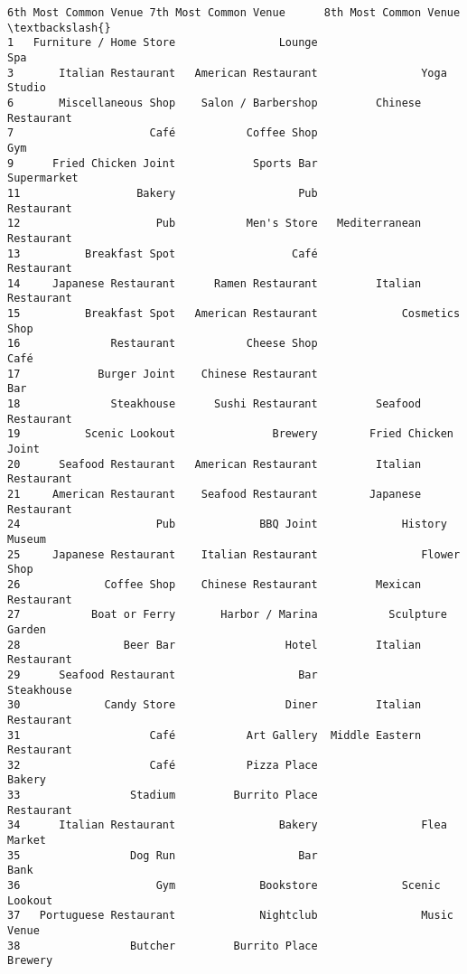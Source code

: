\documentclass[11pt]{article}
\begin{document}
\begin{tcolorbox}[breakable, size=fbox, boxrule=.5pt, pad at break*=1mm, opacityfill=0]
\begin{Verbatim}[commandchars=\\\{\}]
     6th Most Common Venue 7th Most Common Venue      8th Most Common Venue  \textbackslash{}
1   Furniture / Home Store                Lounge                        Spa
3       Italian Restaurant   American Restaurant                Yoga Studio
6       Miscellaneous Shop    Salon / Barbershop         Chinese Restaurant
7                     Café           Coffee Shop                        Gym
9      Fried Chicken Joint            Sports Bar                Supermarket
11                  Bakery                   Pub                 Restaurant
12                     Pub           Men's Store   Mediterranean Restaurant
13          Breakfast Spot                  Café                 Restaurant
14     Japanese Restaurant      Ramen Restaurant         Italian Restaurant
15          Breakfast Spot   American Restaurant             Cosmetics Shop
16              Restaurant           Cheese Shop                       Café
17            Burger Joint    Chinese Restaurant                        Bar
18              Steakhouse      Sushi Restaurant         Seafood Restaurant
19          Scenic Lookout               Brewery        Fried Chicken Joint
20      Seafood Restaurant   American Restaurant         Italian Restaurant
21     American Restaurant    Seafood Restaurant        Japanese Restaurant
24                     Pub             BBQ Joint             History Museum
25     Japanese Restaurant    Italian Restaurant                Flower Shop
26             Coffee Shop    Chinese Restaurant         Mexican Restaurant
27           Boat or Ferry       Harbor / Marina           Sculpture Garden
28                Beer Bar                 Hotel         Italian Restaurant
29      Seafood Restaurant                   Bar                 Steakhouse
30             Candy Store                 Diner         Italian Restaurant
31                    Café           Art Gallery  Middle Eastern Restaurant
32                    Café           Pizza Place                     Bakery
33                 Stadium         Burrito Place                 Restaurant
34      Italian Restaurant                Bakery                Flea Market
35                 Dog Run                   Bar                       Bank
36                     Gym             Bookstore             Scenic Lookout
37   Portuguese Restaurant             Nightclub                Music Venue
38                 Butcher         Burrito Place                    Brewery


\end{Verbatim}
\end{tcolorbox}
\end{document}
